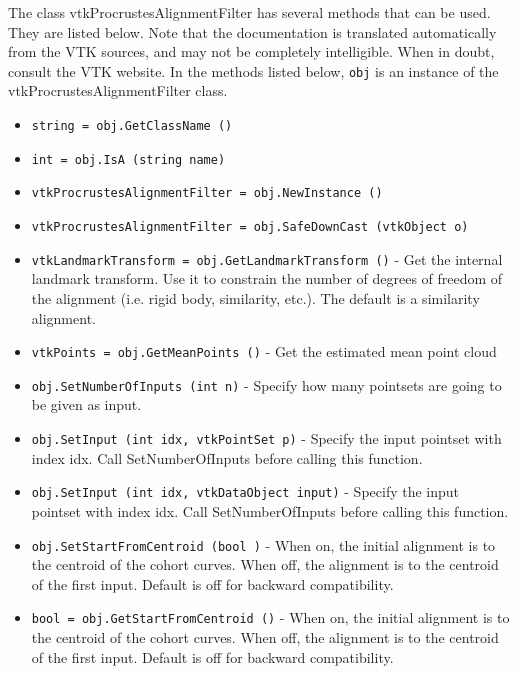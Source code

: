 The class vtkProcrustesAlignmentFilter has several methods that can be used.
  They are listed below.
Note that the documentation is translated automatically from the VTK sources,
and may not be completely intelligible.  When in doubt, consult the VTK website.
In the methods listed below, \verb|obj| is an instance of the vtkProcrustesAlignmentFilter class.
\begin{itemize}
\item  \verb|string = obj.GetClassName ()|

\item  \verb|int = obj.IsA (string name)|

\item  \verb|vtkProcrustesAlignmentFilter = obj.NewInstance ()|

\item  \verb|vtkProcrustesAlignmentFilter = obj.SafeDownCast (vtkObject o)|

\item  \verb|vtkLandmarkTransform = obj.GetLandmarkTransform ()| -  Get the internal landmark transform. Use it to constrain the number of
 degrees of freedom of the alignment (i.e. rigid body, similarity, etc.).
 The default is a similarity alignment.

\item  \verb|vtkPoints = obj.GetMeanPoints ()| -  Get the estimated mean point cloud

\item  \verb|obj.SetNumberOfInputs (int n)| -  Specify how many pointsets are going to be given as input.

\item  \verb|obj.SetInput (int idx, vtkPointSet p)| -  Specify the input pointset with index idx.
 Call SetNumberOfInputs before calling this function.

\item  \verb|obj.SetInput (int idx, vtkDataObject input)| -  Specify the input pointset with index idx.
 Call SetNumberOfInputs before calling this function.

\item  \verb|obj.SetStartFromCentroid (bool )| -  When on, the initial alignment is to the centroid 
 of the cohort curves.  When off, the alignment is to the 
 centroid of the first input.  Default is off for
 backward compatibility.

\item  \verb|bool = obj.GetStartFromCentroid ()| -  When on, the initial alignment is to the centroid 
 of the cohort curves.  When off, the alignment is to the 
 centroid of the first input.  Default is off for
 backward compatibility.


\end{itemize}
